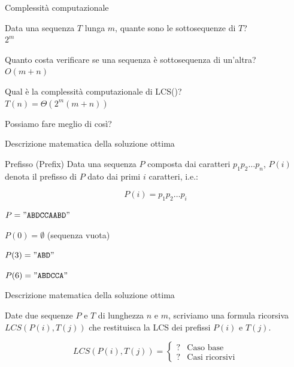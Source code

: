 \begin{frame}{Complessità computazionale}

\BIL
\item Data una sequenza $T$ lunga $m$, quante sono le sottosequenze di
$T$?\\ \pause \alert{$2^m$}
\item Quanto costa verificare se una sequenza è sottosequenza di un'altra?\\
\pause \alert{$O(m+n)$}
\item Qual è la complessità computazionale di \textsf{LCS()}?\\
\pause \alert{$T(n) = \Theta(2^m(m+n))$}
\item Possiamo fare meglio di così?
\EIL

\end{frame}

\begin{frame}{Descrizione matematica della soluzione ottima}

\begin{block}{Prefisso (\alert{Prefix})}
Data una sequenza $P$ composta dai caratteri $p_1p_2{\ldots}p_n$, $P(i)$ denota 
il \alert{prefisso} di $P$ dato dai primi $i$ caratteri, i.e.:

\[
  P(i) = p_1p_2{\ldots}p_i
\]
\end{block}

\bigskip
{}
\BIL
\item $P = \mathtt{"ABDCCAABD"}$
\item $P(0) = \emptyset$ (sequenza vuota)
\item $P(3) = \mathtt{"ABD"}$
\item $P(6) = \mathtt{"ABDCCA"}$
\EIL

\end{frame}

\begin{frame}{Descrizione matematica della soluzione ottima}

Date due sequenze $P$ e $T$ di lunghezza $n$ e $m$, scriviamo
una formula ricorsiva $LCS(P(i), T(j))$ che restituisca la LCS 
dei prefissi $P(i)$ e $T(j)$.

\[
  LCS(P(i),T(j)) = \begin{cases}
   ? & \textrm{Caso base} \\
   ? & \textrm{Casi ricorsivi}
  \end{cases}
\]

\end{frame}

